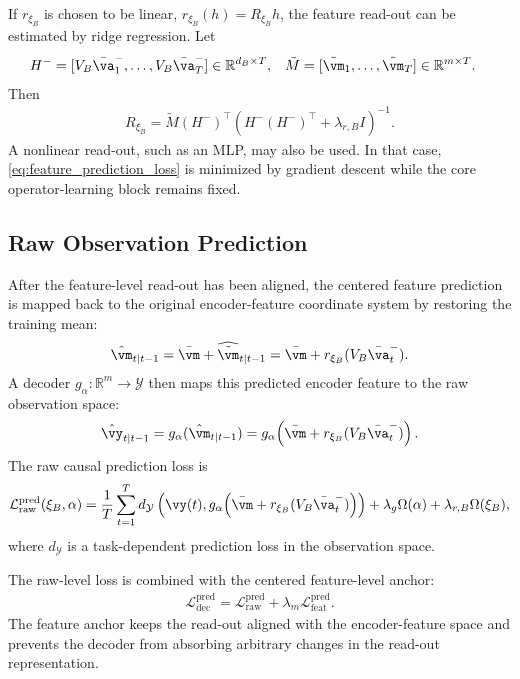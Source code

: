\documentclass[twoside,11pt]{article}
\begin{document}
If $r_{\xi_B}$ is chosen to be linear, $r_{\xi_B}(h)=R_{\xi_B}h$, the
feature read-out can be estimated by ridge regression. Let
\begin{align}
H^-
&=
[V_B\bar{\va}_1^-,\dots,V_B\bar{\va}_T^-]
\in\mathbb R^{d_B\times T},
&
\tilde M
&=
[\tilde{\vm}_1,\dots,\tilde{\vm}_T]
\in\mathbb R^{m\times T}.
\label{eq:readout_design_matrices}
\end{align}
Then
\begin{align}
R_{\xi_B}
=
\tilde M(H^-)^\top
\left(
H^-(H^-)^\top
+
\lambda_{r,B}I
\right)^{-1}.
\label{eq:linear_readout_solution}
\end{align}
A nonlinear read-out, such as an MLP, may also be used. In that case,
\eqref{eq:feature_prediction_loss} is minimized by gradient descent
while the core operator-learning block remains fixed.

\subsection{Raw Observation Prediction}

After the feature-level read-out has been aligned, the centered feature
prediction is mapped back to the original encoder-feature coordinate
system by restoring the training mean:
\begin{align}
\hat{\vm}_{t|t-1}
=
\bar{\vm}
+
\widehat{\tilde{\vm}}_{t|t-1}
=
\bar{\vm}
+
r_{\xi_B}(V_B\bar{\va}_t^-).
\label{eq:mean_restored_predicted_feature}
\end{align}
A decoder $g_\alpha:\mathbb R^m\to\mathcal Y$ then maps this predicted
encoder feature to the raw observation space:
\begin{align}
\hat{\vy}_{t|t-1}
=
g_\alpha(\hat{\vm}_{t|t-1})
=
g_\alpha\!\left(
\bar{\vm}
+
r_{\xi_B}(V_B\bar{\va}_t^-)
\right).
\label{eq:raw_prediction}
\end{align}
The raw causal prediction loss is
\begin{align}
\mathcal L_{\mathrm{raw}}^{\mathrm{pred}}(\xi_B,\alpha)
=
\frac1T
\sum_{t=1}^T
d_{\mathcal Y}
\left(
\vy(t),
g_\alpha\!\left(
\bar{\vm}
+
r_{\xi_B}(V_B\bar{\va}_t^-)
\right)
\right)
+
\lambda_g\Omega(\alpha)
+
\lambda_{r,B}\Omega(\xi_B),
\label{eq:raw_prediction_loss}
\end{align}
where $d_{\mathcal Y}$ is a task-dependent prediction loss in the
observation space.

The raw-level loss is combined with the centered feature-level anchor:
\begin{align}
\mathcal L_{\mathrm{dec}}^{\mathrm{pred}}
=
\mathcal L_{\mathrm{raw}}^{\mathrm{pred}}
+
\lambda_m
\mathcal L_{\mathrm{feat}}^{\mathrm{pred}}.
\label{eq:decoder_prediction_loss_with_feature_anchor}
\end{align}
The feature anchor keeps the read-out aligned with the encoder-feature
space and prevents the decoder from absorbing arbitrary changes in the
read-out representation.
\end{document}
